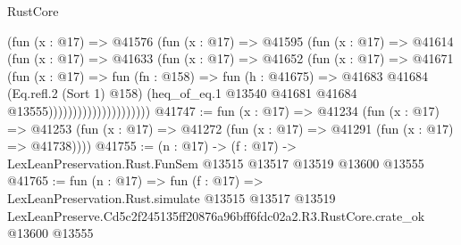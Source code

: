 \begin{lexlean}{RustCore}
\begin{coremodule}
                              (fun (x : @17) =>
                              @41576
                                (fun (x : @17) =>
                                @41595
                                  (fun (x : @17) =>
                                  @41614
                                    (fun (x : @17) =>
                                    @41633
                                      (fun (x : @17) =>
                                      @41652
                                        (fun (x : @17) =>
                                        @41671
                                          (fun (x : @17) =>
                                          fun (fn : @158) =>
                                          fun (h : @41675) =>
                                          @41683
                                            @41684
                                            (Eq.refl.{2} (Sort 1) @158)
                                            (heq_of_eq.{1}
                                              @13540
                                              @41681
                                              @41684
                                              @13555)))))))))))))))))))))
@41747 := fun (x : @17) =>
  @41234
    (fun (x : @17) =>
    @41253 (fun (x : @17) => @41272 (fun (x : @17) => @41291 (fun (x : @17) => @41738))))
@41755 := (n : @17) ->
  (f : @17) -> LexLeanPreservation.Rust.FunSem @13515 @13517 @13519 @13600 @13555
@41765 := fun (n : @17) =>
  fun (f : @17) =>
  LexLeanPreservation.Rust.simulate
    @13515
    @13517
    @13519
    LexLeanPreserve.Cd5c2f245135ff20876a96bff6fdc02a2.R3.RustCore.crate_ok
    @13600
    @13555
\end{coremodule}
\end{lexlean}
